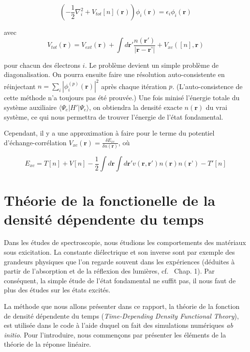 \documentclass[12pt, french]{report}
\theoremstyle{theoreme}
\begin{document}
$$
(-\frac{1}{2}\nabla_i^2 + V_{tot}[n](\textbf{r}))\phi_i(\textbf{r}) = \epsilon_i \phi_i (\textbf{r})
$$

avec
\begin{equation}\label{Vtot}
V_{tot}(\textbf{r}) = V_{ext}(\textbf{r}) + \int d\textbf{r}' \frac{n(\textbf{r}')}{|\textbf{r} - \textbf{r'}|} + V_{xc}([n], \textbf{r})
\end{equation}

pour chacun des électrons $i$. Le problème devient un simple problème de diagonalisation. On pourra ensuite faire une résolution auto-consistente en réinjectant $n = \sum_i |\phi_i^{(p)}(\textbf{r})|^2 $ après chaque itération $p$. (L'auto-consistence de cette méthode n'a toujours pas été prouvée.) Une fois minisé l'énergie totale du système auxiliaire $\langle \Psi_e | H' | \Psi_e \rangle $, on obtiendra la densité exacte $n(\textbf{r})$ du vrai système, ce qui nous permettra de trouver l'énergie de l'état fondamental.

Cependant, il y a une approximation à faire pour le terme du potentiel d'échange-corrélation $V_{xc}(\textbf{r}) = \frac{\delta E_{xc}}{\delta n(\textbf{r})}$, où

\begin{equation}
\label{eqn-exc}
  E_{xc} = T[n] + V[n] - \frac{1}{2}\int d\textbf{r}
  \int d\textbf{r}' v(\textbf{r}, \textbf{r}') n(\textbf{r}) n(\textbf{r'}) - T'[n]
\end{equation}


\section{Théorie de la fonctionelle de la densité dépendente du temps}\label{sec-TDDFT}
Dans les études de spectroscopie, nous étudions les comportements des matériaux sous exicitation. La constante diélectrique et son inverse sont par exemple des grandeurs physiques que l'on regarde souvent dans les expériences (déduites à partir de l'absorption et de la réflexion des lumières, cf.~\cite{Sot03} Chap. 1). Par conséquent, la simple étude de l'état fondamental ne suffit pas, il nous faut de plus des études sur les états excités.

La méthode que nous allons présenter dans ce rapport, la théorie de la fonction de densité dépendente du temps (\textit{Time-Depending Density Functional Theory}), est utilisée dans le code à l'aide duquel on fait des simulations numériques \textit{ab initio}. Pour l'introduire, nous commençons par présenter les éléments de la théorie de la réponse linéaire.
\end{document}
